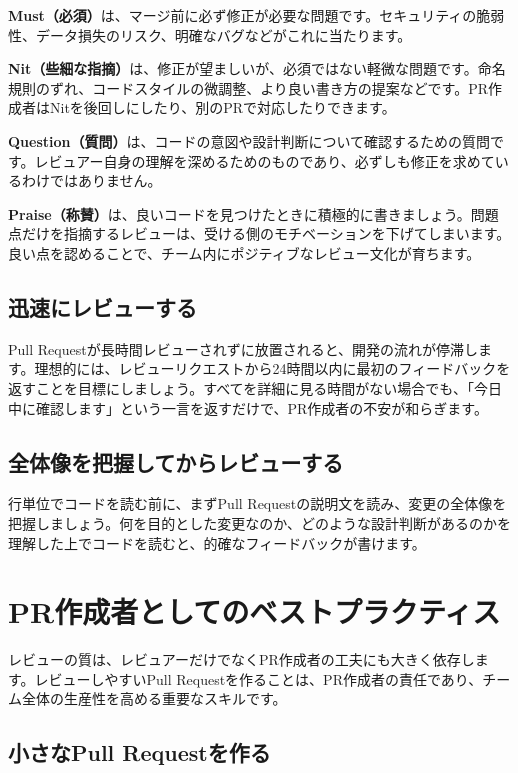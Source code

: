 \textbf{Must（必須）}は、マージ前に必ず修正が必要な問題です。セキュリティの脆弱性、データ損失のリスク、明確なバグなどがこれに当たります。

\textbf{Nit（些細な指摘）}は、修正が望ましいが、必須ではない軽微な問題です。命名規則のずれ、コードスタイルの微調整、より良い書き方の提案などです。PR作成者はNitを後回しにしたり、別のPRで対応したりできます。

\textbf{Question（質問）}は、コードの意図や設計判断について確認するための質問です。レビュアー自身の理解を深めるためのものであり、必ずしも修正を求めているわけではありません。

\textbf{Praise（称賛）}は、良いコードを見つけたときに積極的に書きましょう。問題点だけを指摘するレビューは、受ける側のモチベーションを下げてしまいます。良い点を認めることで、チーム内にポジティブなレビュー文化が育ちます。

\subsection{迅速にレビューする}

Pull Requestが長時間レビューされずに放置されると、開発の流れが停滞します。理想的には、レビューリクエストから24時間以内に最初のフィードバックを返すことを目標にしましょう。すべてを詳細に見る時間がない場合でも、「今日中に確認します」という一言を返すだけで、PR作成者の不安が和らぎます。

\subsection{全体像を把握してからレビューする}

行単位でコードを読む前に、まずPull Requestの説明文を読み、変更の全体像を把握しましょう。何を目的とした変更なのか、どのような設計判断があるのかを理解した上でコードを読むと、的確なフィードバックが書けます。

\section{PR作成者としてのベストプラクティス}

レビューの質は、レビュアーだけでなくPR作成者の工夫にも大きく依存します。レビューしやすいPull Requestを作ることは、PR作成者の責任であり、チーム全体の生産性を高める重要なスキルです。

\subsection{小さなPull Requestを作る}

